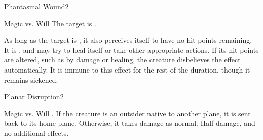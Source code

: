 \begin{spellsection}{Phantasmal Wound}{2}
\begin{spellheader}
\end{spellheader}
\begin{spellcontent}
    \begin{spelltargetinginfo}
    \end{spelltargetinginfo}
    \begin{spelleffects}
        \begin{spellattack}{Magic vs. Will}
            \spellsuccess The target is \sickened.

            As long as the target is \bloodied, it also perceives itself to have no hit points remaining. It is \staggered, and may try to heal itself or take other appropriate actions. If its hit points are altered, such as by damage or healing, the creature disbelieves the effect automatically. It is immune to this effect for the rest of the duration, though it remains sickened.
        \end{spellattack}
        \spelldur \durshort
    \end{spelleffects}
\end{spellcontent}
\begin{spellfooter}
\end{spellfooter}
\end{spellsection}

\begin{spellsection}{Planar Disruption}{2}
\begin{spellheader}
\end{spellheader}
\begin{spellcontent}
    \begin{spelltargetinginfo}
    \end{spelltargetinginfo}
    \begin{spelleffects}
        \begin{spellattack}{Magic vs. Will}
            \spellsuccess {}.
            \spellcritical If the creature is an outsider native to another plane, it is sent back to its home plane. Otherwise, it takes damage as normal.
            \spellfailure Half damage, and no additional effects.
        \end{spellattack}
    \end{spelleffects}
\end{spellcontent}
\begin{spellfooter}
\end{spellfooter}
\end{spellsection}

